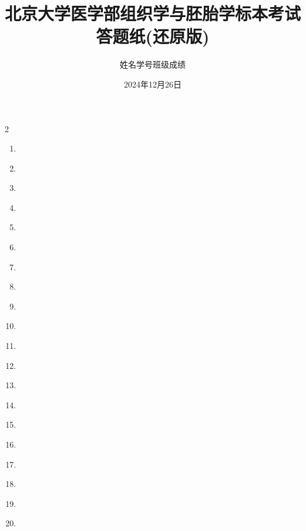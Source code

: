 \documentclass[12pt]{article}
\title{北京大学医学部组织学与胚胎学标本考试答题纸(还原版)}
\author{姓名\underline{\quad\quad\quad}学号\underline{\quad\quad\quad}班级\underline{\quad\quad\quad}成绩\underline{\quad\quad\quad}}
\date{2024年12月26日}
\begin{document}
\maketitle

\begin{multicols}{2}
\begin{enumerate}
    \item \underline{\quad\quad\quad\quad\quad\quad\quad}
    \item \underline{\quad\quad\quad\quad\quad\quad\quad}
    \item \underline{\quad\quad\quad\quad\quad\quad\quad}
    \item \underline{\quad\quad\quad\quad\quad\quad\quad}
    \item \underline{\quad\quad\quad\quad\quad\quad\quad}
    \item \underline{\quad\quad\quad\quad\quad\quad\quad}
    \item \underline{\quad\quad\quad\quad\quad\quad\quad}
    \item \underline{\quad\quad\quad\quad\quad\quad\quad}
    \item \underline{\quad\quad\quad\quad\quad\quad\quad}
    \item \underline{\quad\quad\quad\quad\quad\quad\quad}
    \item \underline{\quad\quad\quad\quad\quad\quad\quad}
    \item \underline{\quad\quad\quad\quad\quad\quad\quad}
    \item \underline{\quad\quad\quad\quad\quad\quad\quad}
    \item \underline{\quad\quad\quad\quad\quad\quad\quad}
    \item \underline{\quad\quad\quad\quad\quad\quad\quad}
    \item \underline{\quad\quad\quad\quad\quad\quad\quad}
    \item \underline{\quad\quad\quad\quad\quad\quad\quad}
    \item \underline{\quad\quad\quad\quad\quad\quad\quad}
    \item \underline{\quad\quad\quad\quad\quad\quad\quad}
    \item \underline{\quad\quad\quad\quad\quad\quad\quad}
\end{enumerate}
\end{multicols}
\end{document}
